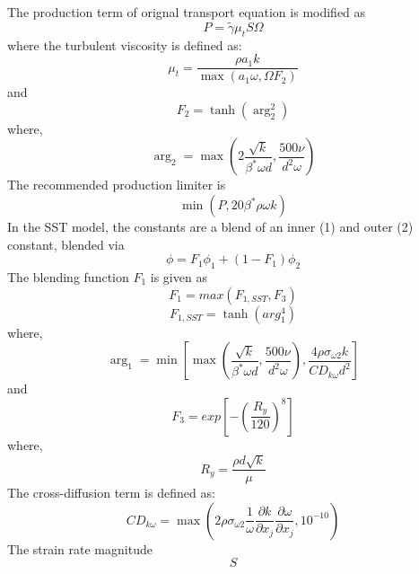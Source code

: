 The production term of orignal transport equation is modified as
\begin{equation} 
  P = \widetilde{\gamma} \mu_t S\Omega  
\end{equation}
where the turbulent viscosity is defined as:
\begin{equation}
\mu_{t}=\frac{\rho a_{1} k}{\max \left(a_{1} \omega, \Omega F_{2}\right)}
\end{equation}
and
\begin{equation}
F_{2}=\tanh \left(\arg _{2}^{2}\right)
\end{equation}
where,
\begin{equation}
\arg _{2}=\max \left(2 \frac{\sqrt{k}}{\beta^{*} \omega d}, \frac{500 \nu}{d^{2} \omega}\right)
\end{equation}
The recommended production limiter is
\begin{equation}
\min \left(P, 20 \beta^{*} \rho \omega k\right)
\end{equation}
In the SST model, the constants are a blend of an inner (1) and outer (2) constant, blended via
\begin{equation}
\phi=F_{1} \phi_{1}+\left(1-F_{1}\right) \phi_{2}
\end{equation}
The blending function $F_1$ is given as
\begin{equation}
F_1 = max \left( F_{1,SST},F_3 \right)
\end{equation}
\begin{equation}
F_{1,SST}=\tanh \left(a r g_{1}^{4}\right)
\end{equation}
where,
\begin{equation}
\arg _{1}=\min \left[\max \left(\frac{\sqrt{k}}{\beta^{*} \omega d}, \frac{500 \nu}{d^{2} \omega}\right), \frac{4 \rho \sigma_{\omega 2} k}{C D_{k \omega} d^{2}}\right]
\end{equation}
and
\begin{equation}
F_3 = exp \left[ - \left( \frac{R_y}{120} \right)^8 \right]
\end{equation}
where, 
\begin{equation}
  R_y = \frac{\rho d \sqrt{k}}{\mu}
\end{equation}
The cross-diffusion term is defined as:
\begin{equation}
C D_{k \omega}=\max \left(2 \rho \sigma_{\omega 2} \frac{1}{\omega} \frac{\partial k}{\partial x_{j}} \frac{\partial \omega}{\partial x_{j}}, 10^{-10}\right)
\end{equation}
The strain rate magnitude 
\begin{equation}
S
\end{equation}
